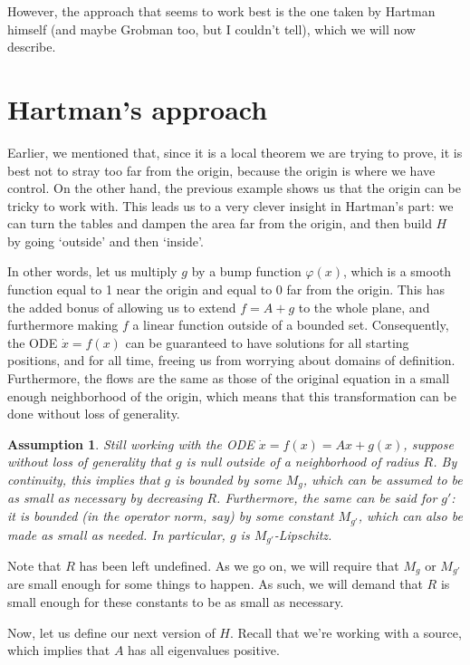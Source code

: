 \documentclass{article}
\newtheorem*{Assumption}{Assumption}
\begin{document}
However, the approach that seems to work best is the one taken by Hartman himself (and maybe Grobman too, but I couldn't tell), which we will now describe.

\section{Hartman's approach}

Earlier, we mentioned that, since it is a local theorem we are trying to prove, it is best not to stray too far from the origin, because the origin is where we have control. On the other hand, the previous example shows us that the origin can be tricky to work with. This leads us to a very clever insight in Hartman's part: we can turn the tables and dampen the area far from the origin, and then build $H$ by going `outside' and then `inside'.

In other words, let us multiply $g$ by a bump function $\varphi(x)$, which is a smooth function equal to 1 near the origin and equal to 0 far from the origin. This has the added bonus of allowing us to extend $f = A + g$ to the whole plane, and furthermore making $f$ a linear function outside of a bounded set. Consequently, the ODE $\dot x = f(x)$ can be guaranteed to have solutions for all starting positions, and for all time, freeing us from worrying about domains of definition. Furthermore, the flows are the same as those of the original equation in a small enough neighborhood of the origin, which means that this transformation can be done without loss of generality.

\begin{Assumption}
Still working with the ODE $\dot x = f(x) = A x + g(x)$, suppose without loss of generality that $g$ is null outside of a neighborhood of radius $R$. By continuity, this implies that $g$ is bounded by some $M_g$, which can be assumed to be as small as necessary by decreasing $R$. Furthermore, the same can be said for $g'$: it is bounded (in the operator norm, say) by some constant $M_{g'}$, which can also be made as small as needed. In particular, $g$ is $M_{g'}$-Lipschitz.
\end{Assumption}

Note that $R$ has been left undefined. As we go on, we will require that $M_g$ or $M_{g'}$ are small enough for some things to happen. As such, we will demand that $R$ is small enough for these constants to be as small as necessary.

Now, let us define our next version of $H$. Recall that we're working with a source, which implies that $A$ has all eigenvalues positive.
\end{document}
